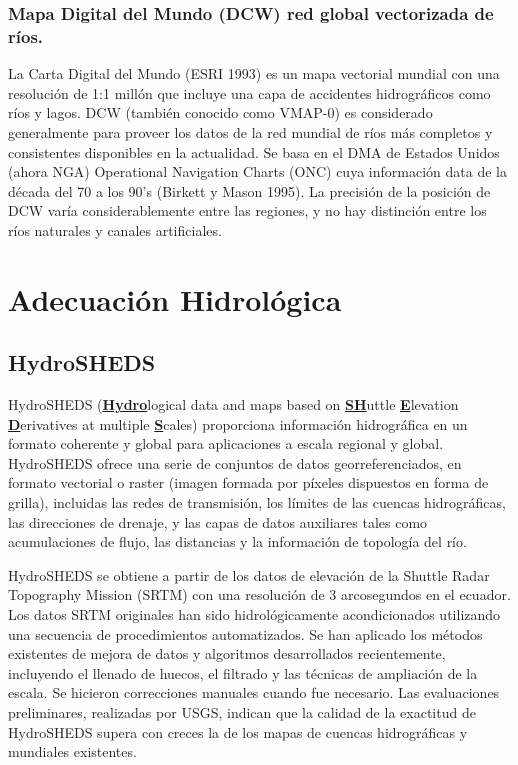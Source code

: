 \documentclass[10pt,a4paper, twoside]{report}
\begin{document}
\subsubsection{Mapa Digital del Mundo (DCW) red global vectorizada de ríos.}
\label{DCWLabel}

La Carta Digital del Mundo (ESRI 1993) es un mapa vectorial mundial con una resolución de 1:1 millón que incluye una capa de accidentes hidrográficos como ríos y lagos. DCW (también conocido como VMAP-0) es considerado generalmente para proveer los datos de la red mundial de ríos más completos y consistentes disponibles en la actualidad. Se basa en el DMA de Estados Unidos (ahora NGA) Operational Navigation Charts (ONC) cuya información data de la década del 70 a los 90's (Birkett y Mason 1995). La precisión de la posición de DCW varía considerablemente entre las regiones, y no hay distinción entre los ríos naturales y canales artificiales.

\section{Adecuación Hidrológica}


\subsection{HydroSHEDS}
\label{HydroSHEDSDef}

HydroSHEDS (\underline{\textbf{Hydro}}logical data and maps based on \underline{\textbf{SH}}uttle \underline{\textbf{E}}levation \underline{\textbf{D}}erivatives at multiple \underline{\textbf{S}}cales) proporciona información hidrográfica en un formato coherente y global para aplicaciones a escala regional y global. HydroSHEDS ofrece una serie de conjuntos de datos georreferenciados, en formato vectorial o raster (imagen formada por píxeles dispuestos en forma de grilla), incluidas las redes de transmisión, los límites de las cuencas hidrográficas, las direcciones de drenaje, y las capas de datos auxiliares tales como acumulaciones de flujo, las distancias y la información de topología del río.

HydroSHEDS se obtiene a partir de los datos de elevación de la Shuttle Radar Topography Mission (SRTM) con una resolución de 3 arcosegundos en el ecuador. Los datos SRTM originales han sido hidrológicamente acondicionados utilizando una secuencia de procedimientos automatizados. Se han aplicado los métodos existentes de mejora de datos y algoritmos desarrollados recientemente, incluyendo el llenado de huecos, el filtrado y las técnicas de ampliación de la escala. Se hicieron correcciones manuales cuando fue necesario. Las evaluaciones preliminares, realizadas por USGS, indican que la calidad de la exactitud de HydroSHEDS supera con creces la de los mapas de cuencas hidrográficas y mundiales existentes.
\end{document}
